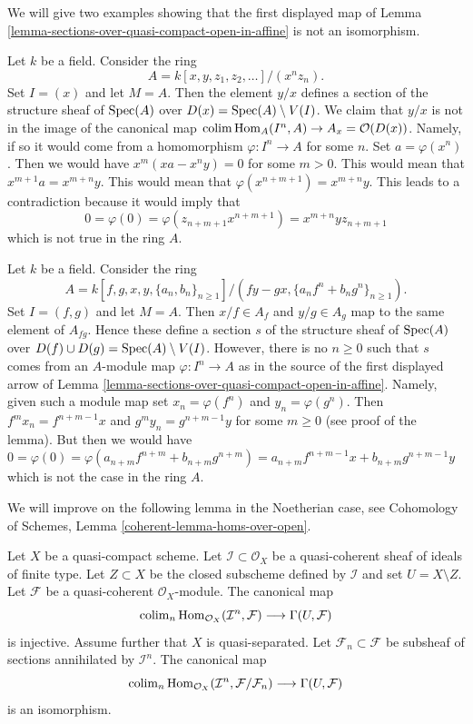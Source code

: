 \begin{example}
\label{example-does-not-work-in-general}
We will give two examples showing that the first displayed map of
Lemma \ref{lemma-sections-over-quasi-compact-open-in-affine}
is not an isomorphism.

\medskip\noindent
Let $k$ be a field. Consider the ring
$$
A = k[x, y, z_1, z_2, \ldots]/(x^nz_n).
$$
Set $I = (x)$ and let $M = A$. Then the element $y/x$ defines a section of
the structure sheaf of $\mathop{\mathrm{Spec}}(A)$ over $D(x) = \mathop{\mathrm{Spec}}(A) \setminus V(I)$.
We claim that $y/x$ is not in the image of the canonical map
$\mathop{\mathrm{colim}}\nolimits \mathop{\mathrm{Hom}}\nolimits_A(I^n, A) \to A_x = \mathcal{O}(D(x))$. Namely, if so it
would come from a homomorphism $\varphi : I^n \to A$ for some $n$.
Set $a = \varphi(x^n)$. Then we would have $x^m(xa - x^ny) = 0$ for some
$m > 0$. This would mean that $x^{m + 1}a = x^{m + n}y$. This would mean that
$\varphi(x^{n + m + 1}) = x^{m + n}y$. This leads to a contradiction
because it would imply that
$$
0 = \varphi(0) = \varphi(z_{n + m + 1} x^{n + m + 1}) =
x^{m + n}y z_{n + m + 1}
$$
which is not true in the ring $A$.

\medskip\noindent
Let $k$ be a field. Consider the ring
$$
A = k[f, g, x, y, \{a_n, b_n\}_{n \geq 1}]/
(fy - gx, \{a_nf^n + b_ng^n\}_{n \geq 1}).
$$
Set $I = (f, g)$ and let $M = A$. Then $x/f \in A_f$ and $y/g \in A_g$
map to the same element of $A_{fg}$. Hence these define a section $s$
of the structure sheaf of $\mathop{\mathrm{Spec}}(A)$ over
$D(f) \cup D(g) = \mathop{\mathrm{Spec}}(A) \setminus V(I)$. However, there is no
$n \geq 0$ such that $s$ comes from an $A$-module map
$\varphi : I^n \to A$ as in the source of the first displayed arrow
of Lemma \ref{lemma-sections-over-quasi-compact-open-in-affine}.
Namely, given such a module map set
$x_n = \varphi(f^n)$ and $y_n = \varphi(g^n)$.
Then $f^mx_n = f^{n + m - 1}x$ and
$g^my_n = g^{n + m - 1}y$ for some $m \geq 0$ (see proof
of the lemma). But then we would have
$0 = \varphi(0) =
\varphi(a_{n + m}f^{n + m} + b_{n + m}g^{n + m}) =
a_{n + m}f^{n + m - 1}x + b_{n + m}g^{n + m - 1}y$ which is not the case
in the ring $A$.
\end{example}

\noindent
We will improve on the following lemma in the Noetherian case, see
Cohomology of Schemes, Lemma \ref{coherent-lemma-homs-over-open}.

\begin{lemma}
\label{lemma-sections-over-quasi-compact-open}
Let $X$ be a quasi-compact scheme.
Let $\mathcal{I} \subset \mathcal{O}_X$ be a
quasi-coherent sheaf of ideals of finite type.
Let $Z \subset X$ be the closed subscheme
defined by $\mathcal{I}$ and set $U = X \setminus Z$.
Let $\mathcal{F}$ be a quasi-coherent $\mathcal{O}_X$-module.
The canonical map
$$
\mathop{\mathrm{colim}}\nolimits_n \mathop{\mathrm{Hom}}\nolimits_{\mathcal{O}_X}(\mathcal{I}^n,
\mathcal{F})
\longrightarrow
\Gamma(U, \mathcal{F})
$$
is injective. Assume further that $X$ is quasi-separated.
Let $\mathcal{F}_n \subset \mathcal{F}$
be subsheaf of sections annihilated by $\mathcal{I}^n$.
The canonical map
$$
\mathop{\mathrm{colim}}\nolimits_n \mathop{\mathrm{Hom}}\nolimits_{\mathcal{O}_X}(\mathcal{I}^n,
\mathcal{F}/\mathcal{F}_n)
\longrightarrow
\Gamma(U, \mathcal{F})
$$
is an isomorphism.
\end{lemma}

